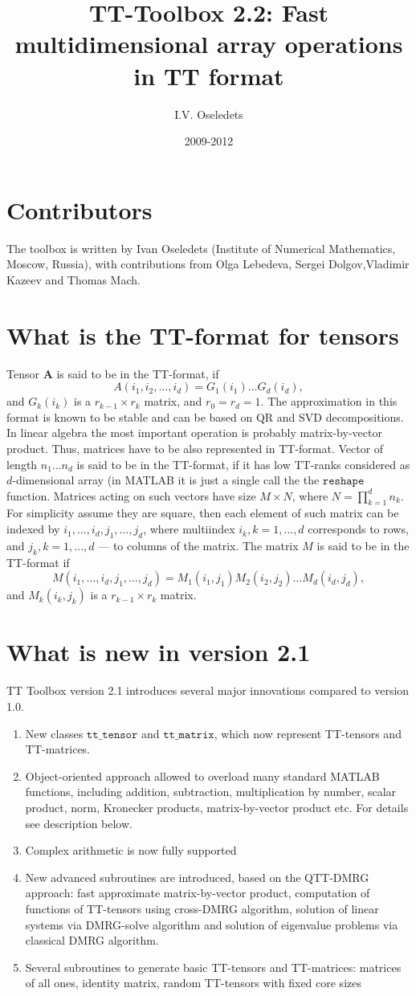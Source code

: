 \documentclass[a4paper,12pt,twoside]{article}
\date{2009-2012}
\title{TT-Toolbox 2.2: Fast multidimensional array operations in TT format }
\author{I.V. Oseledets}
\def\tt{\texttt{tt\_tensor}}
\def\ttm{\texttt{tt\_matrix}}
\def\A{{\mathbf{A}}}
\begin{document}
\maketitle

\section{Contributors}
  The toolbox is written by Ivan Oseledets (Institute of Numerical Mathematics, Moscow, Russia), 
with contributions from Olga Lebedeva, Sergei Dolgov,Vladimir Kazeev and Thomas Mach.
\section{What is the TT-format for tensors}
Tensor $\A$ is said to be in the TT-format, if 
$$A(i_1,i_2,\ldots,i_d) = G_1(i_1) \ldots G_d(i_d),$$
and $G_k(i_k)$ is a $r_{k-1} \times r_k$ matrix, and $r_0 =r_d = 1$.  The approximation in this format is known to be
stable and can be based on QR and SVD decompositions. In linear algebra the most important operation
is probably matrix-by-vector product. Thus, matrices have to be also represented in TT-format.
Vector of length $n_1 \ldots n_d$ is said to be in the TT-format, if it has low TT-ranks considered
as $d$-dimensional array (in MATLAB it is just a single call the the $\texttt{reshape}$ function. 
Matrices acting on such vectors have size $M \times N$, where $N=\prod_{k=1}^d n_k$. For simplicity
assume they are square, then each element of such matrix can be indexed by $i_1,\ldots,i_d, j_1,\ldots,j_d$,
where multiindex $i_k, k=1,\ldots,d$ corresponds to rows, and $j_k,k=1,\ldots,d$ --- to columns of the
matrix. The matrix $M$ is said to be in the TT-format if 
$$M(i_1,\ldots,i_d,j_1,\ldots,j_d) = M_1(i_1,j_1) M_2(i_2,j_2) \ldots M_d(i_d,j_d),$$
and $M_k(i_k,j_k)$ is a $r_{k-1} \times r_k$ matrix. 
\section{What is new in version 2.1}
  TT Toolbox version 2.1 introduces several major innovations compared to version 1.0. \\
  \begin{enumerate}
  \item New classes $\tt$ and $\ttm$, which now represent TT-tensors and TT-matrices.
  \item Object-oriented approach allowed to overload many standard MATLAB functions, including addition, subtraction, 
  multiplication by number, scalar product, norm, Kronecker products, matrix-by-vector product etc. For details
 see description below.
  \item Complex arithmetic is now fully supported 
\item New advanced subroutines are introduced, based on the QTT-DMRG approach: fast approximate matrix-by-vector
product, computation of functions of TT-tensors using cross-DMRG algorithm, solution of linear systems via
  DMRG-solve algorithm and solution of eigenvalue problems via classical DMRG algorithm. 
 \item Several subroutines to generate basic TT-tensors and TT-matrices: matrices of all ones, identity matrix,
 random TT-tensors with fixed core sizes 
 \end{enumerate}
\end{document}
